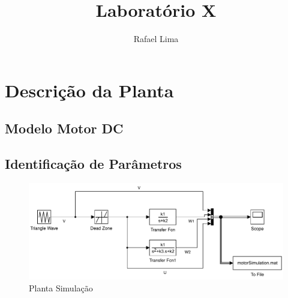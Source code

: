 \documentclass[a4paper,11pt]{article}
\title{Laboratório X} %
\author{Rafael Lima}
\begin{document}


\section{Descrição da Planta}

\subsection{Modelo Motor DC}



\subsection{Identificação de Parâmetros}


\begin{figure}[H]
    \centering
    \includegraphics[width=1.0\linewidth]{tex/img/dcMotorSimulation.pdf}
    \caption{Planta Simulação}
    \label{fig:my_label}
\end{figure}
\end{document}
